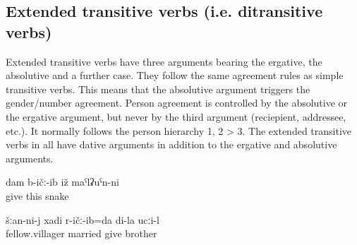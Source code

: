 
\subsection{Extended transitive verbs (i.e. ditransitive verbs)}
\label{sec:Extended transitive verbs and ditransitive verbs}

Extended transitive verbs have three arguments bearing the ergative, the absolutive and a further case. They follow the same agreement rules as simple transitive verbs. This means that the absolutive argument triggers the gender/number agreement. Person agreement is controlled by the absolutive or the ergative argument, but never by the third argument (reciepient, addressee, etc.). It normally follows the person hierarchy 1, 2 > 3. The extended transitive verbs in  all have dative arguments in addition to the ergative and absolutive arguments.
%
\begin{exe}
	\ex	\label{ex:extended di-transitive verbs}
	\begin{xlist}
		\ex	{} 
		\ex	{} 
		\ex	{} 
		\ex	{} 
	\end{xlist}

	\ex	\label{ex:The snake gave it to me}
	\gll	dam	b-ičː-ib	iž	maˁlʡuˁn-ni\\
			give	this	snake\\
	\glt	{}

	\ex	\label{ex:My brother married me off to a fellow villager}
	\gll	šːan-ni-j	xadi	r-ičː-ib=da	di-la	ucːi-l\\
		fellow.villager married	give	 brother\\
	\glt	{}
\end{exe}

